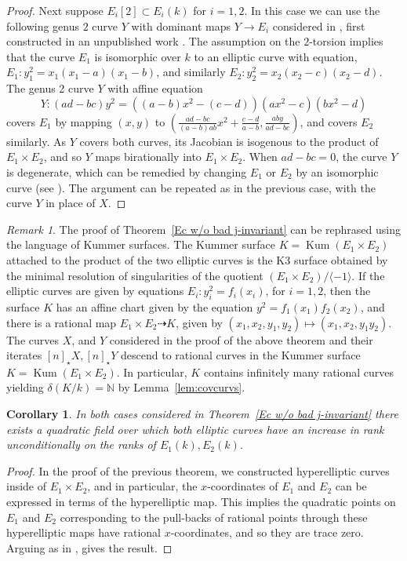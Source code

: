 \documentclass[a4paper,11pt]{amsart}
\theoremstyle{plain}
\newtheorem{coroll}[thm]{Corollary}
\theoremstyle{remark}
\newtheorem{remark}[thm]{Remark}
\newcommand{\nn}{\mathbb{N}}
\newcommand{\Kum}{\operatorname{Kum}}
\newcommand{\dendegs}{\delta}
\begin{document}
\begin{proof}
    Next suppose $E_i[2]\subset E_i(k)$ for $i=1,2$. In this case we can use the following genus $2$ curve $Y$ with dominant maps $Y\to E_i$ considered in \cite[Section 4.2]{GL24}, first constructed in an unpublished work \cite{Scholten}. The assumption on the $2$-torsion implies that the curve $E_1$ is isomorphic over $k$ to an elliptic curve with equation, $E_1 :y_1^2=x_1(x_1-a)(x_1-b)$, and similarly $E_2 : y_2^2=x_2(x_2-c)(x_2-d)$. The genus 2 curve $Y$ with affine equation 
    \[Y: (ad-bc)y^2=((a-b)x^2-(c-d))(ax^2-c)(bx^2-d)\] 
    covers $E_1$ by mapping $(x, y)$ to $\left(\frac{ad - bc}{(a - b)ab}x^2 + \frac{c - d}{a - b}, \frac{ab y}{ad - bc}\right)$, and covers $E_2$ similarly. As $Y$ covers both curves, its Jacobian is isogenous to the product of $E_1\times E_2$, and so $Y$ maps birationally into $E_1 \times E_2$. When $ad-bc=0$, the curve $Y$ is degenerate, which can be remedied by 
    changing $E_1$ or $E_2$ by an isomorphic curve (see \cite[(4.1.2)]{GL24}). The argument can be repeated as in the previous case, with the curve $Y$ in place of $X$.
\end{proof}


 \begin{remark}
    The proof of Theorem~\ref{Ec w/o bad j-invariant} can be rephrased using the language of Kummer surfaces. The Kummer surface $K=\Kum(E_1\times E_2)$ attached to the product of the two elliptic curves is the K3 surface obtained by the minimal resolution of singularities of the quotient $(E_1 \times E_2)/\langle -1 \rangle$. If the elliptic curves are given by equations $E_i:y_i^2=f_i(x_i)$, for $i=1,2$, then the surface $K$ has an affine chart given by the equation $y^2=f_1(x_1)f_2(x_2)$, and there is a rational map $E_1\times E_2\dashrightarrow K$, given by $(x_1,x_2,y_1,y_2)\mapsto(x_1,x_2,y_1y_2)$.
     The curves $X$, and $Y$ considered in the proof of the above theorem and their iterates $[n]_\star X, [n]_\star Y$  descend to rational curves in the Kummer surface $K=\Kum(E_1\times E_2)$.  In particular, $K$ contains infinitely many rational curves yielding  $\dendegs(K/k)=\nn$ by Lemma~\ref{lem:covcurvs}.
 \end{remark}    


\begin{coroll} In both cases considered in Theorem~\ref{Ec w/o bad j-invariant} 
 there exists a quadratic field over which both elliptic curves have an increase in rank unconditionally on the ranks of $E_1(k), E_2(k)$.
    \label{quadrankjump}
\end{coroll}
\begin{proof}
    In the proof of the previous theorem, we constructed hyperelliptic curves inside of $E_1 \times E_2$, and in particular, the $x$-coordinates of $E_1$ and $E_2$ can be expressed in terms of the hyperelliptic map. This implies the quadratic points on $E_1$ and $E_2$ corresponding to the pull-backs of rational points through these hyperelliptic maps have rational $x$-coordinates, and so they are trace zero. Arguing as in , gives the result. 
\end{proof}
\end{document}
